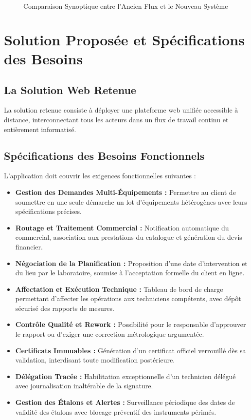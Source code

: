 \documentclass{bts-report}
\begin{document}
\begin{figure}[H]
  \centering
  
  \caption{Comparaison Synoptique entre l'Ancien Flux et le Nouveau Syst\`eme}
  \label{fig:process-comparison}
\end{figure}

\section{Solution Propos\'ee et Sp\'ecifications des Besoins}
\subsection{La Solution Web Retenue}
La solution retenue consiste \`a d\'eployer une plateforme web unifi\'ee accessible \`a distance, interconnectant tous les acteurs dans un flux de travail continu et enti\`erement informatis\'e.

\subsection{Sp\'ecifications des Besoins Fonctionnels}
L'application doit couvrir les exigences fonctionnelles suivantes :
\begin{itemize}
  \item \textbf{Gestion des Demandes Multi-\'Equipements :} Permettre au client de soumettre en une seule d\'emarche un lot d'\'equipements h\'et\'erog\`enes avec leurs sp\'ecifications pr\'ecises.
  \item \textbf{Routage et Traitement Commercial :} Notification automatique du commercial, association aux prestations du catalogue et g\'en\'eration du devis financier.
  \item \textbf{N\'egociation de la Planification :} Proposition d'une date d'intervention et du lieu par le laboratoire, soumise \`a l'acceptation formelle du client en ligne.
  \item \textbf{Affectation et Ex\'ecution Technique :} Tableau de bord de charge permettant d'affecter les op\'erations aux techniciens comp\'etents, avec d\'ep\^ot s\'ecuris\'e des rapports de mesures.
  \item \textbf{Contr\^ole Qualit\'e et Rework :} Possibilit\'e pour le responsable d'approuver le rapport ou d'exiger une correction m\'etrologique argument\'ee.
  \item \textbf{Certificats Immuables :} G\'en\'eration d'un certificat officiel verrouill\'e d\`es sa validation, interdisant toute modification post\'erieure.
  \item \textbf{D\'el\'egation Trac\'ee :} Habilitation exceptionnelle d'un technicien d\'el\'egu\'e avec journalisation inalt\'erable de la signature.
  \item \textbf{Gestion des \'Etalons et Alertes :} Surveillance p\'eriodique des dates de validit\'e des \'etalons avec blocage pr\'eventif des instruments p\'erim\'es.
\end{itemize}
\end{document}
